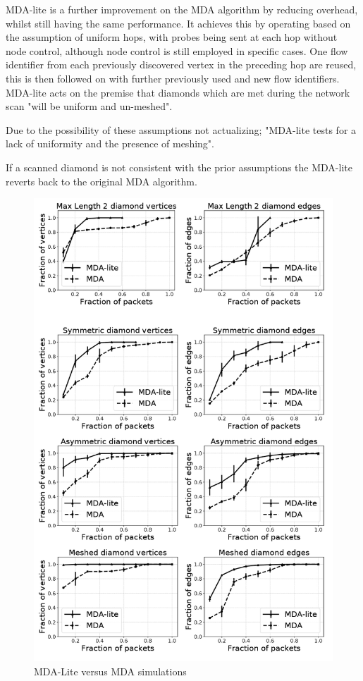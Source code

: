 MDA-lite is a further improvement on the MDA algorithm by reducing overhead, whilst still having the same performance. It achieves this by operating based on the assumption of uniform hops, with probes being sent at each hop without node control, although node control is still employed in specific cases. One flow identifier from each previously discovered vertex in the preceding hop are reused, this is then followed on with further previously used and new flow identifiers. MDA-lite acts on the premise that diamonds which are met during the network scan "will be uniform and un-meshed". \cite{MDA-lite} 

Due to the possibility of these assumptions not actualizing; "MDA-lite tests for a lack of uniformity and the presence of meshing". \cite{MDA-lite} 

If a scanned diamond is not consistent with the prior assumptions the MDA-lite reverts back to the original MDA algorithm. 

\begin{figure}[!ht]
  \begin{center}
    \includegraphics[scale=0.3]{images/MDA_lite.png}
    \caption{MDA-Lite versus MDA simulations\cite{MDA-lite}}
    \label{figure:MDA_lite_fig}
  \end{center}
\end{figure}

